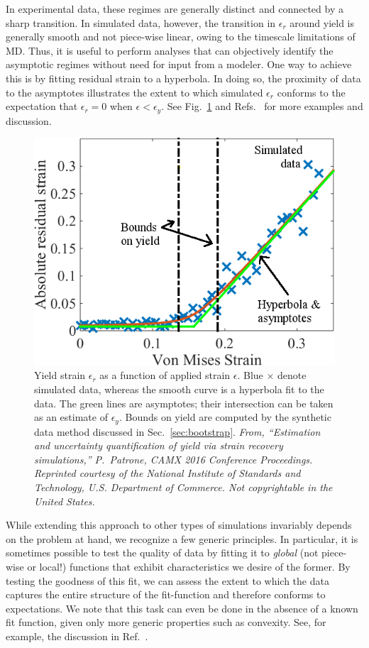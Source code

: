 In experimental data, these regimes are generally distinct and connected by a sharp transition.  In simulated data, however, the transition in $\epsilon_r$ around yield is generally smooth and not piece-wise linear, owing to the timescale limitations of MD.  Thus, it is useful to perform analyses that can objectively identify the asymptotic regimes without need for input from a modeler.  One way to achieve this is by fitting residual strain to a hyperbola.  In doing so, the proximity of data to the asymptotes illustrates the extent to which simulated $\epsilon_r$ conforms to the expectation that $\epsilon_r=0$ when $\epsilon < \epsilon_y$.  See Fig.~\ref{fig:yield} and Refs.~\cite{patrone1,patrone2} for more examples and discussion.

\begin{figure}
  \centering
  \includegraphics[width=0.9\linewidth]{hyperbola.png}
  \caption{Yield strain $\epsilon_r$ as a function of applied strain $\epsilon$.  Blue $\times$ denote simulated data, whereas the smooth curve is a hyperbola fit to the data.  The green lines are asymptotes; their intersection can be taken as an estimate of $\epsilon_y$.    Bounds on yield are computed by the synthetic data method discussed in Sec.~\ref{sec:bootstrap}. {\it From, ``Estimation and uncertainty quantification of yield via strain recovery simulations,'' P.\ Patrone, CAMX 2016 Conference Proceedings.  Reprinted courtesy of the National Institute of Standards and Technology, U.S. Department of Commerce. Not copyrightable in the United States.}}
  \label{fig:yield}
\end{figure}

While extending this approach to other types of simulations invariably depends on the problem at hand, we recognize a few generic principles.  In particular, it is sometimes possible to test the quality of data by fitting it to {\it global} (not piece-wise or local!) functions that exhibit characteristics we desire of the former.  By testing the goodness of this fit, we can assess the extent to which the data captures the entire structure of the fit-function and therefore conforms to expectations.  We note that this task can even be done in the absence of a known fit function, given only more generic properties such as convexity.  See, for example, the discussion in Ref.~\cite{PatroneAIAA}.  


